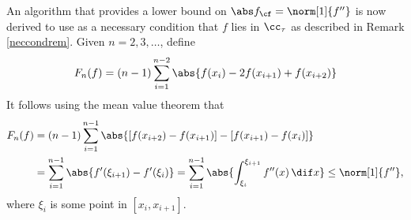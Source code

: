 An algorithm that provides a lower bound on $\Fnorm{f}=\norm[1]{f''}$ is now derived to use as a necessary condition that $f$ lies in $\cc_\tau$ as described in Remark \ref{neccondrem}.  Given $n =2, 3, \ldots$, define 
\begin{equation} \label{Fnormalg}
F_n(f) = (n-1)\sum_{i=1}^{n-2} \abs{f(x_i) - 2 f(x_{i+1})+f(x_{i+2})}
\end{equation}
It follows using the mean value theorem that 
\begin{align*}
F_n(f) &= (n-1)\sum_{i=1}^{n-1} \abs{[f(x_{i+2}) - f(x_{i+1})] - [f(x_{i+1}) - f(x_{i})]} \\
&= \sum_{i=1}^{n-1} \abs{f'(\xi_{i+1}) - f'(\xi_{i})} = \sum_{i=1}^{n-1} \abs{\int_{\xi_i}^{\xi_{i+1}} f''(x) \, \dif x} \le \norm[1]{f''},
\end{align*}
where $\xi_i$ is some point in $[x_i,x_{i+1}]$.

